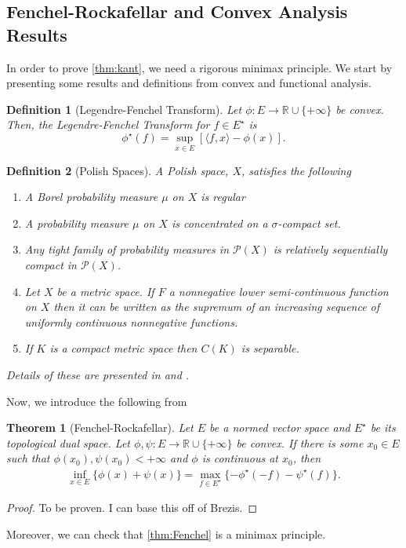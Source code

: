 \documentclass[12pt]{article}
\newcommand{\R}{\mathbb{R}}
\theoremstyle{plain}
\newtheorem{thm}{Theorem}[section]
\newtheorem{defn}{Definition}[section]
\numberwithin{equation}{section}
\begin{document}
\subsection{Fenchel-Rockafellar and Convex Analysis Results}
In order to prove \autoref{thm:kant}, we need a rigorous minimax principle. We start by presenting some results and definitions from convex and functional analysis.
\begin{defn}[Legendre-Fenchel Transform]
  Let $\phi: E \to \R\cup \{+\infty\}$ be convex. Then, the Legendre-Fenchel Transform for $f\in E^\star$ is
  \begin{equation}
    \phi^\star(f) = \sup_{x\in E}\left[\langle f, x\rangle - \phi(x)\right].
  \end{equation}  
\end{defn}
\begin{defn}[Polish Spaces]
A Polish space, $X$, satisfies the following 
\begin{enumerate}
  \item A Borel probability measure $\mu$ on $X$ is regular
  \item A probability measure $\mu$ on $X$ is concentrated on a $\sigma$-compact set.
  \item Any tight family of probability measures in $\mathcal{P}(X)$ is relatively sequentially compact in $\mathcal{P}(X)$.
  \item Let $X$ be a metric space. If $F$ a nonnegative lower semi-continuous function on $X$ then it can be written as the supremum of an increasing sequence of uniformly continuous nonnegative functions.
  \item If $K$ is a compact metric space then $C(K)$ is separable.
\end{enumerate}
Details of these are presented in \cite{villani} and \cite{billingsey}.
\end{defn}
Now, we introduce the following from \cite{brezis}
\begin{thm}[Fenchel-Rockafellar]\label{thm:Fenchel}
  Let $E$ be a normed vector space and $E^\star$ be its topological dual space. Let $\phi,\psi:E\to\R\cup\{+\infty\}$ be convex. If there is some $x_0\in E$ such that $\phi(x_0),\psi(x_0) <+\infty$ and $\phi$ is continuous at $x_0$, then
  \begin{align*}
    \inf_{x\in E}\{\phi(x)+\psi(x)\} = \max_{f\in E^\star}\{-\phi^\star(-f)-\psi^\star(f)\}.
  \end{align*}
\end{thm}
\begin{proof}
  To be proven. I can base this off of Brezis.
\end{proof}
Moreover, we can check that \autoref{thm:Fenchel} is a minimax principle.
\end{document}
